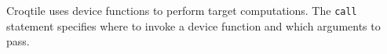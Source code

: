Croqtile uses device functions to perform target computations. The \texttt{call} statement specifies where to invoke a device function and which arguments to pass.
